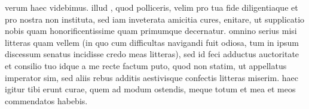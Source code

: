  verum haec videbimus. illud , quod polliceris, velim pro tua fide diligentiaque et pro nostra non instituta, sed iam inveterata amicitia cures, enitare, ut supplicatio nobis quam honorificentissime quam primumque decernatur. omnino serius misi litteras quam vellem (in quo cum difficultas navigandi fuit odiosa, tum in ipsum discessum senatus incidisse credo meas litteras), sed id feci adductus auctoritate et consilio tuo idque a me recte factum puto, quod non statim, ut appellatus imperator sim, sed aliis rebus additis aestivisque confectis litteras miserim. haec igitur tibi erunt curae, quem ad modum ostendis, meque totum et mea et meos commendatos habebis.
